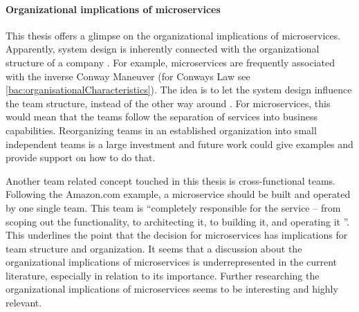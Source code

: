 \paragraph{Organizational implications of microservices}
This thesis offers a glimpse on the organizational implications of microservices.
Apparently, system design is inherently connected with the organizational structure of a company \citep[p. 201]{Newman2015}.
For example, microservices are frequently associated with the inverse Conway Maneuver (for Conways Law see \ref{bac:organisationalCharacteristics}).
The idea is to let the system design influence the team structure, instead of the other way around \citep[p. 201]{Newman2015}.
For microservices, this would mean that the teams follow the separation of services into business capabilities.
Reorganizing teams in an established organization into small independent teams is a large investment and future work could give examples and provide support on how to do that.

Another team related concept touched in this thesis is cross-functional teams.
Following the Amazon.com example, a microservice should be built and operated by one single team.
This team is ``completely responsible for the service -- from scoping out the functionality, to architecting it, to building it, and operating it \cite{Vogels2006}''.
This underlines the point that the decision for microservices has implications for team structure and organization.
It seems that a discussion about the organizational implications of microservices is underrepresented in the current literature, especially in relation to its importance.
Further researching the organizational implications of microservices seems to be interesting and highly relevant.

